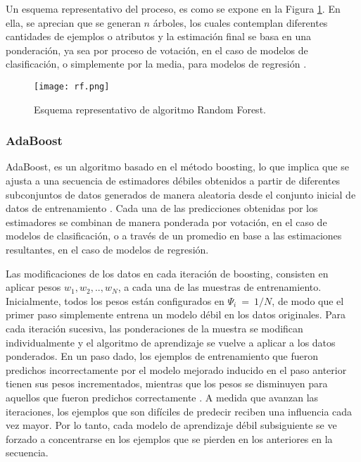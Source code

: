 Un esquema representativo del proceso, es como se expone en la Figura \ref{rf1}. En ella, se aprecian que se generan $n$ árboles, los cuales contemplan diferentes cantidades de ejemplos o atributos y la estimación final se basa en una ponderación, ya sea por proceso de votación, en el caso de modelos de clasificación, o simplemente por la media, para modelos de regresión \cite{Breiman2001}.

\begin{figure}[!h]
	\centering
	\texttt{[image: rf.png]}
	\caption{Esquema representativo de algoritmo Random Forest.}
	\label{rf1}
	
\end{figure}
 
\subsubsection{AdaBoost}

AdaBoost, es un algoritmo basado en el método boosting, lo que implica que se ajusta a una secuencia de estimadores débiles obtenidos a partir de diferentes subconjuntos de datos generados de manera aleatoria desde el conjunto inicial de datos de entrenamiento \cite{CAO2013745}. Cada una de las predicciones obtenidas por los estimadores se combinan de manera ponderada por votación, en el caso de modelos de clasificación, o a través de un promedio en base a las estimaciones resultantes, en el caso de modelos de regresión.

Las modificaciones de los datos en cada iteración de boosting, consisten en aplicar pesos $w_{1},w_{2},..,w_{N}$, a cada una de las muestras de entrenamiento. Inicialmente, todos los pesos están configurados en $\Psi_{i}\ =\ 1/N$, de modo que el primer paso simplemente entrena un modelo débil en los datos originales. Para cada iteración sucesiva, las ponderaciones de la muestra se modifican individualmente y el algoritmo de aprendizaje se vuelve a aplicar a los datos ponderados. En un paso dado, los ejemplos de entrenamiento que fueron predichos incorrectamente por el modelo mejorado inducido en el paso anterior tienen sus pesos incrementados, mientras que los pesos se disminuyen para aquellos que fueron predichos correctamente \cite{hastie2009multi}. A medida que avanzan las iteraciones, los ejemplos que son difíciles de predecir reciben una influencia cada vez mayor. Por lo tanto, cada modelo de aprendizaje débil subsiguiente se ve forzado a concentrarse en los ejemplos que se pierden en los anteriores en la secuencia.

